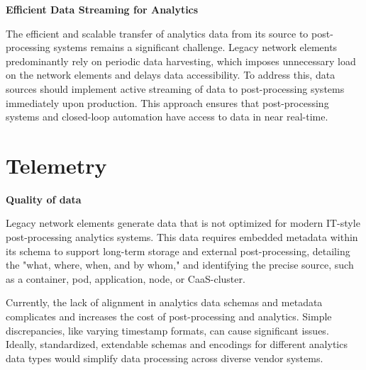 \documentclass[11pt,sigconf]{iabart}
\begin{document}
\textbf{Efficient Data Streaming for Analytics}

The efficient and scalable transfer of analytics data from its source to post-processing systems remains a significant challenge. Legacy network elements predominantly rely on periodic data harvesting, which imposes unnecessary load on the network elements and delays data accessibility. To address this, data sources should implement active streaming of data to post-processing systems immediately upon production. This approach ensures that post-processing systems and closed-loop automation have access to data in near real-time.


\section{Telemetry} \label{telemetry}





\textbf{Quality of data} 

Legacy network elements generate data that is not optimized for modern IT-style post-processing analytics systems. This data requires embedded metadata within its schema to support long-term storage and external post-processing, detailing the "what, where, when, and by whom," and identifying the precise source, such as a container, pod, application, node, or CaaS-cluster.

Currently, the lack of alignment in analytics data schemas and metadata complicates and increases the cost of post-processing and analytics. Simple discrepancies, like varying timestamp formats, can cause significant issues. Ideally, standardized, extendable schemas and encodings for different analytics data types would simplify data processing across diverse vendor systems.
\end{document}
